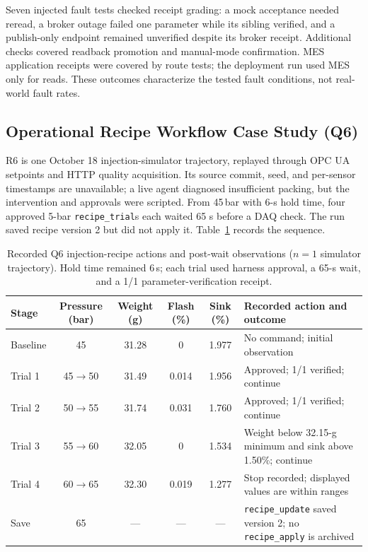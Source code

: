 Seven injected fault tests checked receipt grading: a mock acceptance needed
reread, a broker outage failed one parameter while its sibling verified, and
a publish-only endpoint remained unverified despite its broker receipt.
Additional checks covered readback promotion and manual-mode confirmation.
MES application receipts were covered by route tests; the deployment run used
MES only for reads. These outcomes characterize the tested fault conditions,
not real-world fault rates.

\subsection{Operational Recipe Workflow Case Study (Q6)}
\label{sec:recipeexperiment}
R6 is one October 18 injection-simulator trajectory, replayed through OPC UA
setpoints and HTTP quality acquisition. Its source commit, seed, and
per-sensor timestamps are unavailable; a live agent diagnosed insufficient
packing, but the intervention and approvals were scripted. From 45\,bar with
6-s hold time, four approved 5-bar \texttt{recipe\_trial}s each waited 65 s
before a DAQ check. The run saved recipe version 2 but did not apply it.
Table~\ref{tab:q6actions} records the sequence.

\begin{table}[!b]
\centering
\caption{Recorded Q6 injection-recipe actions and post-wait observations
($n=1$ simulator trajectory). Hold time remained 6\,s; each trial used
harness approval, a 65-s wait, and a 1/1 parameter-verification receipt.}
\label{tab:q6actions}
\footnotesize
\setlength{\tabcolsep}{3.5pt}
\begin{tabularx}{\textwidth}{@{}l c c c c X@{}}
\toprule
Stage & Pressure (bar) & Weight (g) & Flash (\%) & Sink (\%) & Recorded action and outcome \\
\midrule
Baseline & 45 & 31.28 & 0 & 1.977 & No command; initial observation \\
Trial 1 & 45$\rightarrow$50 & 31.49 & 0.014 & 1.956 & Approved; 1/1 verified; continue \\
Trial 2 & 50$\rightarrow$55 & 31.74 & 0.031 & 1.760 & Approved; 1/1 verified; continue \\
Trial 3 & 55$\rightarrow$60 & 32.05 & 0 & 1.534 & Weight below 32.15-g minimum and sink above 1.50\%; continue \\
Trial 4 & 60$\rightarrow$65 & 32.30 & 0.019 & 1.277 & Stop recorded; displayed values are within ranges \\
Save & 65 & --- & --- & --- & \texttt{recipe\_update} saved version 2; no \texttt{recipe\_apply} is archived \\
\bottomrule
\end{tabularx}
\end{table}

